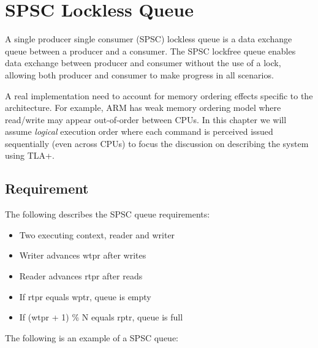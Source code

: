 % 


\chapter{SPSC Lockless Queue}

A single producer single consumer (SPSC) lockless queue is a data exchange queue
between a producer and a consumer. The SPSC lockfree queue enables data exchange
between producer and consumer without the use of a lock, allowing both producer
and consumer to make progress in all scenarios.\newline

A real implementation need to account for memory ordering effects specific to
the architecture. For example, ARM has weak memory ordering model where
read/write may appear out-of-order between CPUs. In this chapter we will assume
\textit{logical} execution order where each command is perceived issued
sequentially (even across CPUs) to focus the discussion on describing the system
using TLA+.
\newline

\section{Requirement}

The following describes the SPSC queue requirements: 

\begin{itemize}
    \item Two executing context, reader and writer
    \item Writer advances wtpr after writes
    \item Reader advances rtpr after reads
    \item If rtpr equals wptr, queue is empty
    \item If (wtpr + 1) \% N equals rptr, queue is full
\end{itemize}

The following is an example of a SPSC queue:
\begin{center}
\end{center}

